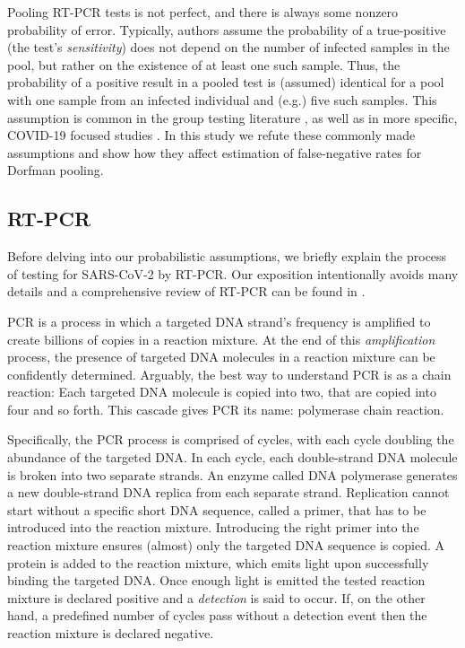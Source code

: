 \documentclass{article}
\begin{document}
Pooling RT-PCR tests is not perfect, and there is always some nonzero
probability of error. Typically, authors assume the probability of a
true-positive (the test's \emph{sensitivity}) does not depend on the
number of infected samples in the pool, but rather on the existence of
at least one such sample. Thus, the probability of a positive result
in a pooled test is (assumed) identical for a pool with one sample
from an infected individual and (e.g.) five such samples. This
assumption is common in the group testing literature \cite{Kim,
  OptimalDorfmanPool}, as well as in more specific, COVID-19 focused
studies \cite{Simplistic1, Simplistic2}. In this study we refute these
commonly made assumptions and show how they affect estimation of
false-negative rates for Dorfman pooling.


\subsection{RT-PCR}
Before delving into our probabilistic assumptions, we briefly explain
the process of testing for SARS-CoV-2 by RT-PCR. Our exposition
intentionally avoids many details and a comprehensive review of RT-PCR
can be found in \cite{COVID-RTPCR, PCRBook}.

PCR is a process in which a targeted DNA strand's frequency is
amplified to create billions of copies in a reaction mixture. At the
end of this \emph{amplification} process, the presence of targeted DNA
molecules in a reaction mixture can be confidently
determined. Arguably, the best way to understand PCR is as a chain
reaction: Each targeted DNA molecule is copied into two, that are
copied into four and so forth. This cascade gives PCR its name:
polymerase chain reaction.

Specifically, the PCR process is comprised of cycles, with each cycle
doubling the abundance of the targeted DNA. In each cycle, each
double-strand DNA molecule is broken into two separate strands. An
enzyme called DNA polymerase generates a new double-strand DNA replica
from each separate strand. Replication cannot start without a specific
short DNA sequence, called a primer, that has to be introduced into
the reaction mixture. Introducing the right primer into the reaction
mixture ensures (almost) only the targeted DNA sequence is copied. A
protein is added to the reaction mixture, which emits light upon
successfully binding the targeted DNA. Once enough light is emitted
the tested reaction mixture is declared positive and a
\emph{detection} is said to occur. If, on the other hand, a predefined
number of cycles pass without a detection event then the reaction
mixture is declared negative.
\end{document}
